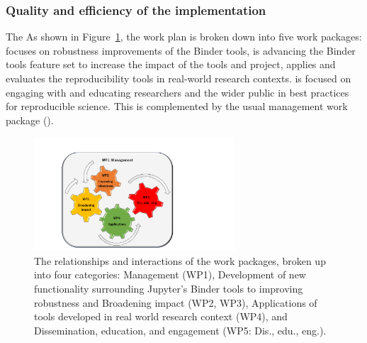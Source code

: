 

\subsubsection{Quality and efficiency of the implementation}\label{sec:workplan-structure}

\ifgrantagreement The \else As shown in
Figure~\ref{fig:workpackages}, the \fi work plan is broken down into five work
packages:  focuses on robustness improvements of the
Binder tools,  is advancing the Binder tools feature set to
increase the impact of the tools and project,  applies and
evaluates the reproducibility tools in real-world research contexts.
 is focused on engaging with and educating researchers and the
wider public in best practices for reproducible science. This is complemented by
the usual management work package ().

\begin{figure}[htb]
  \centering
  \includegraphics[width=0.67\textwidth]{images/WP.pdf}
  \caption{
    \label{fig:workpackages}
    The relationships and interactions of the work packages,
    broken up into four categories: Management (WP1),
    Development of new functionality surrounding Jupyter's Binder tools to improving robustness
    and Broadening impact (WP2, WP3),
    Applications of tools developed in real world research context (WP4),
    and Dissemination, education, and engagement (WP5: Dis., edu., eng.).
  }
\end{figure}

